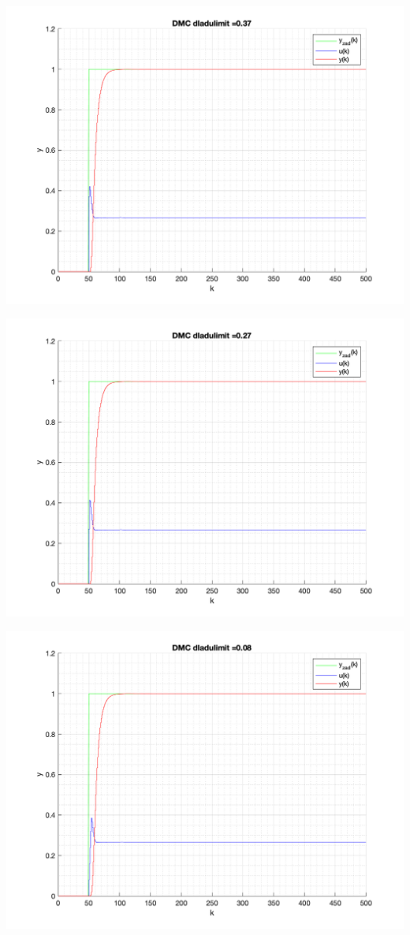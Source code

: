 \documentclass[a4paper, 11pt]{article}
\begin{document}
\begin{enumerate}
 \includegraphics[width=\linewidth]{./ModelsP6_dulimit/P4_DMC_dulimit_0_37_png.png} 
 
 \includegraphics[width=\linewidth]{./ModelsP6_dulimit/P4_DMC_dulimit_0_27_png.png} 
 
 \includegraphics[width=\linewidth]{./ModelsP6_dulimit/P4_DMC_dulimit_0_08_png.png} 
 

\end{enumerate}
\end{document}
